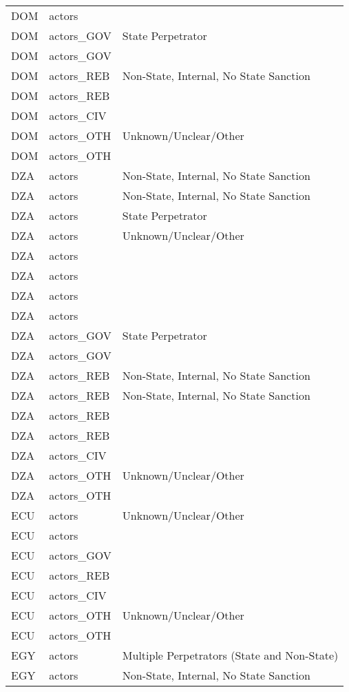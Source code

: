 \begin{table}[ht]
\begin{tabular}{lll}
  DOM & actors &  \\ 
  DOM & actors\_GOV & State Perpetrator \\ 
  DOM & actors\_GOV &  \\ 
  DOM & actors\_REB & Non-State, Internal, No State Sanction \\ 
  DOM & actors\_REB &  \\ 
  DOM & actors\_CIV &  \\ 
  DOM & actors\_OTH & Unknown/Unclear/Other \\ 
  DOM & actors\_OTH &  \\ 
  DZA & actors & Non-State, Internal, No State Sanction \\ 
  DZA & actors & Non-State, Internal, No State Sanction \\ 
  DZA & actors & State Perpetrator \\ 
  DZA & actors & Unknown/Unclear/Other \\ 
  DZA & actors &  \\ 
  DZA & actors &  \\ 
  DZA & actors &  \\ 
  DZA & actors &  \\ 
  DZA & actors\_GOV & State Perpetrator \\ 
  DZA & actors\_GOV &  \\ 
  DZA & actors\_REB & Non-State, Internal, No State Sanction \\ 
  DZA & actors\_REB & Non-State, Internal, No State Sanction \\ 
  DZA & actors\_REB &  \\ 
  DZA & actors\_REB &  \\ 
  DZA & actors\_CIV &  \\ 
  DZA & actors\_OTH & Unknown/Unclear/Other \\ 
  DZA & actors\_OTH &  \\ 
  ECU & actors & Unknown/Unclear/Other \\ 
  ECU & actors &  \\ 
  ECU & actors\_GOV &  \\ 
  ECU & actors\_REB &  \\ 
  ECU & actors\_CIV &  \\ 
  ECU & actors\_OTH & Unknown/Unclear/Other \\ 
  ECU & actors\_OTH &  \\ 
  EGY & actors & Multiple Perpetrators (State and Non-State) \\ 
  EGY & actors & Non-State, Internal, No State Sanction \\ 

\end{tabular}
\end{table}
